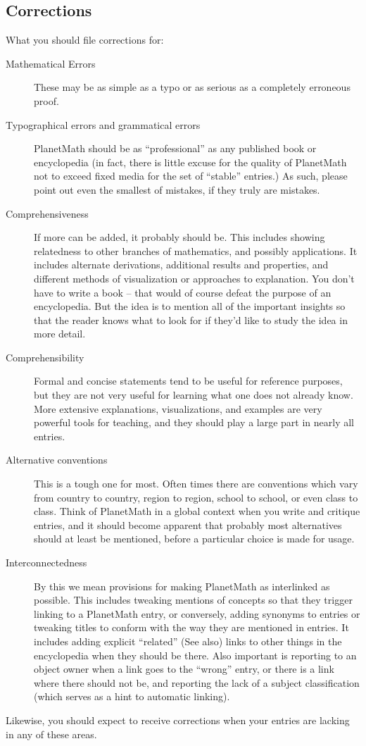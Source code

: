 \subsection*{Corrections}
What you should file corrections for:
\begin{description}
\item[Mathematical Errors] These may be as simple as a typo or as
serious as a completely erroneous proof.
\item[Typographical errors and grammatical errors] PlanetMath should
be as ``professional'' as any published book or encyclopedia (in
fact, there is little excuse for the quality of PlanetMath not to
exceed fixed media for the set of ``stable'' entries.) As such,
please point out even the smallest of mistakes, if they truly are
mistakes.
\item[Comprehensiveness] If more can be added, it probably should
be. This includes showing relatedness to other branches of
mathematics, and possibly applications. It includes alternate
derivations, additional results and properties, and different
methods of visualization or approaches to explanation. You don't
have to write a book -- that would of course defeat the purpose of
an encyclopedia. But the idea is to mention all of the important
insights so that the reader knows what to look for if they'd like to
study the idea in more detail.
\item[Comprehensibility] Formal and concise statements tend to be
useful for reference purposes, but they are not very useful for
learning what one does not already know. More extensive
explanations, visualizations, and examples are very powerful tools
for teaching, and they should play a large part in nearly all
entries.
\item[Alternative conventions] This is a tough one for most. Often
times there are conventions which vary from country to country,
region to region, school to school, or even class to class. Think of
PlanetMath in a global context when you write and critique entries,
and it should become apparent that probably most alternatives should
at least be mentioned, before a particular choice is made for usage.
\item[Interconnectedness] By this we mean provisions for making
PlanetMath as interlinked as possible. This includes tweaking
mentions of concepts so that they trigger linking to a PlanetMath
entry, or conversely, adding synonyms to entries or tweaking titles
to conform with the way they are mentioned in entries. It includes
adding explicit ``related'' (See also) links to other things in the
encyclopedia when they should be there. Also important is reporting
to an object owner when a link goes to the ``wrong'' entry, or there
is a link where there should not be, and reporting the lack of a
subject classification (which serves as a hint to automatic
linking).
\end{description}
Likewise, you should expect to receive corrections when your entries
are lacking in any of these areas.

